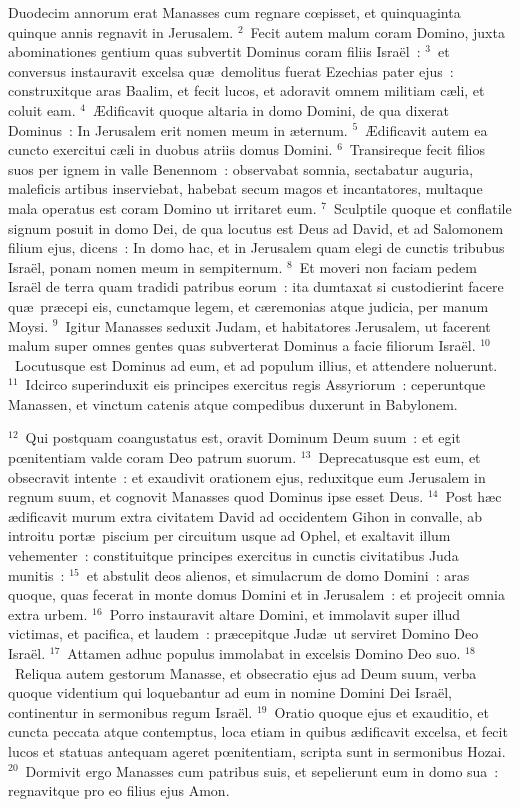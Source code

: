 \lettrine[lines=10,image=true,loversize=0.05,lraise=-0.03]{D}{}uodecim annorum erat Manasses cum regnare cœpisset, et quinquaginta quinque annis regnavit in Jerusalem.
${}^{2}$~Fecit autem malum coram Domino, juxta abominationes gentium quas subvertit Dominus coram filiis Isra\"el~:
${}^{3}$~et conversus instauravit excelsa qu\ae\ demolitus fuerat Ezechias pater ejus~: construxitque aras Baalim, et fecit lucos, et adoravit omnem militiam c\ae li, et coluit eam.
${}^{4}$~\AE dificavit quoque altaria in domo Domini, de qua dixerat Dominus~: In Jerusalem erit nomen meum in \ae ternum.
${}^{5}$~\AE dificavit autem ea cuncto exercitui c\ae li in duobus atriis domus Domini.
${}^{6}$~Transireque fecit filios suos per ignem in valle Benennom~: observabat somnia, sectabatur auguria, maleficis artibus inserviebat, habebat secum magos et incantatores, multaque mala operatus est coram Domino ut irritaret eum.
${}^{7}$~Sculptile quoque et conflatile signum posuit in domo Dei, de qua locutus est Deus ad David, et ad Salomonem filium ejus, dicens~: In domo hac, et in Jerusalem quam elegi de cunctis tribubus Isra\"el, ponam nomen meum in sempiternum.
${}^{8}$~Et moveri non faciam pedem Isra\"el de terra quam tradidi patribus eorum~: ita dumtaxat si custodierint facere qu\ae\ pr\ae cepi eis, cunctamque legem, et c\ae remonias atque judicia, per manum Moysi.
${}^{9}$~Igitur Manasses seduxit Judam, et habitatores Jerusalem, ut facerent malum super omnes gentes quas subverterat Dominus a facie filiorum Isra\"el.
${}^{10}$~Locutusque est Dominus ad eum, et ad populum illius, et attendere noluerunt.
${}^{11}$~Idcirco superinduxit eis principes exercitus regis Assyriorum~: ceperuntque Manassen, et vinctum catenis atque compedibus duxerunt in Babylonem.


${}^{12}$~Qui postquam coangustatus est, oravit Dominum Deum suum~: et egit pœnitentiam valde coram Deo patrum suorum.
${}^{13}$~Deprecatusque est eum, et obsecravit intente~: et exaudivit orationem ejus, reduxitque eum Jerusalem in regnum suum, et cognovit Manasses quod Dominus ipse esset Deus.
${}^{14}$~Post h\ae c \ae dificavit murum extra civitatem David ad occidentem Gihon in convalle, ab introitu port\ae\ piscium per circuitum usque ad Ophel, et exaltavit illum vehementer~: constituitque principes exercitus in cunctis civitatibus Juda munitis~:
${}^{15}$~et abstulit deos alienos, et simulacrum de domo Domini~: aras quoque, quas fecerat in monte domus Domini et in Jerusalem~: et projecit omnia extra urbem.
${}^{16}$~Porro instauravit altare Domini, et immolavit super illud victimas, et pacifica, et laudem~: pr\ae cepitque Jud\ae\ ut serviret Domino Deo Isra\"el.
${}^{17}$~Attamen adhuc populus immolabat in excelsis Domino Deo suo.
${}^{18}$~Reliqua autem gestorum Manasse, et obsecratio ejus ad Deum suum, verba quoque videntium qui loquebantur ad eum in nomine Domini Dei Isra\"el, continentur in sermonibus regum Isra\"el.
${}^{19}$~Oratio quoque ejus et exauditio, et cuncta peccata atque contemptus, loca etiam in quibus \ae dificavit excelsa, et fecit lucos et statuas antequam ageret pœnitentiam, scripta sunt in sermonibus Hozai.
${}^{20}$~Dormivit ergo Manasses cum patribus suis, et sepelierunt eum in domo sua~: regnavitque pro eo filius ejus Amon.



